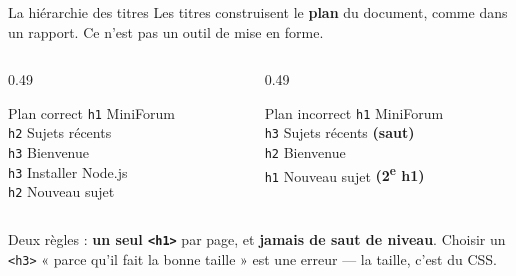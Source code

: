 \documentclass[aspectratio=169,11pt]{beamer}
\begin{document}
\begin{frame}{La hiérarchie des titres}
  Les titres construisent le \textbf{plan} du document, comme dans un rapport. Ce n'est pas un outil de mise en forme.
  \vspace{0.25cm}
  \begin{columns}[T]
    \begin{column}{0.49\textwidth}
      \begin{exampleblock}{Plan correct}
        \texttt{h1} MiniForum\\
        \quad\texttt{h2} Sujets récents\\
        \quad\quad\texttt{h3} Bienvenue\\
        \quad\quad\texttt{h3} Installer Node.js\\
        \quad\texttt{h2} Nouveau sujet
      \end{exampleblock}
    \end{column}
    \begin{column}{0.49\textwidth}
      \begin{alertblock}{Plan incorrect}
        \texttt{h1} MiniForum\\
        \quad\texttt{h3} Sujets récents \textcolor{alertRed}{\textbf{(saut)}}\\
        \quad\quad\texttt{h2} Bienvenue\\
        \texttt{h1} Nouveau sujet \textcolor{alertRed}{\textbf{(2\textsuperscript{e} h1)}}
      \end{alertblock}
    \end{column}
  \end{columns}
  \vspace{0.3cm}
  \begin{center}
    \small Deux règles : \textbf{un seul \texttt{<h1>}} par page, et \textbf{jamais de saut de niveau}.
    Choisir un \texttt{<h3>} « parce qu'il fait la bonne taille » est une erreur --- la taille, c'est du CSS.
  \end{center}
\end{frame}
\end{document}
